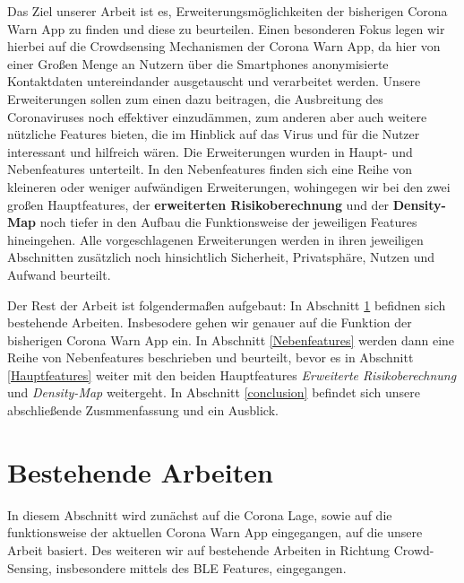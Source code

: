 \documentclass[conference]{IEEEtran}
\begin{document}
Das Ziel unserer Arbeit ist es, Erweiterungsmöglichkeiten der bisherigen Corona Warn App zu finden und diese zu beurteilen. 
Einen besonderen Fokus legen wir hierbei auf die Crowdsensing Mechanismen der Corona Warn App, da hier von einer Großen Menge an Nutzern über die Smartphones anonymisierte Kontaktdaten untereindander ausgetauscht und verarbeitet werden.
Unsere Erweiterungen sollen zum einen dazu beitragen, die Ausbreitung des Coronaviruses noch effektiver einzudämmen, zum anderen aber auch weitere nützliche Features bieten, die im Hinblick auf das Virus und für die Nutzer interessant und hilfreich wären.
Die Erweiterungen wurden in Haupt- und Nebenfeatures unterteilt. In den Nebenfeatures finden sich eine Reihe von kleineren oder weniger aufwändigen Erweiterungen, wohingegen wir bei den zwei großen Hauptfeatures, der \textbf{erweiterten Risikoberechnung} und der \textbf{Density-Map} noch tiefer in den Aufbau die Funktionsweise der jeweiligen Features hineingehen.
Alle vorgeschlagenen Erweiterungen werden in ihren jeweiligen Abschnitten zusätzlich noch hinsichtlich Sicherheit, Privatsphäre, Nutzen und Aufwand beurteilt. 

Der Rest der Arbeit ist folgendermaßen aufgebaut: In Abschnitt \ref{rel_work} befidnen sich bestehende Arbeiten. Insbesodere gehen wir genauer auf die Funktion der bisherigen Corona Warn App ein. 
In Abschnitt \ref{Nebenfeatures} werden dann eine Reihe von Nebenfeatures beschrieben und beurteilt, bevor es in Abschnitt \ref{Hauptfeatures} weiter mit den beiden Hauptfeatures \textit{Erweiterte Risikoberechnung} und \textit{Density-Map} weitergeht. 
In Abschnitt \ref{conclusion} befindet sich unsere abschließende Zusmmenfassung und ein Ausblick. 

\section{Bestehende Arbeiten} \label{rel_work}

In diesem Abschnitt wird zunächst auf die Corona Lage, sowie auf die funktionsweise der aktuellen Corona Warn App eingegangen, auf die unsere Arbeit basiert. 
Des weiteren wir auf bestehende Arbeiten in Richtung Crowd-Sensing, insbesondere mittels des BLE Features, eingegangen. 
\end{document}
